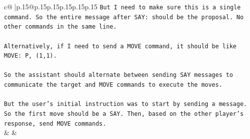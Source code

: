 \documentclass{article}
\begin{document}
{\begin{supertabular}{c@{$\;$}|p{.15\linewidth}@{}p{.15\linewidth}p{.15\linewidth}p{.15\linewidth}p{.15\linewidth}p{.15\linewidth}}
{{{\texttt{But I need to make sure this is a single command. So the entire message after SAY: should be the proposal. No other commands in the same line.} \\
\\ 
\texttt{Alternatively, if I need to send a MOVE command, it should be like MOVE: P, (1,1).} \\
\\ 
\texttt{So the assistant should alternate between sending SAY messages to communicate the target and MOVE commands to execute the moves.} \\
\\ 
\texttt{But the user's initial instruction was to start by sending a message. So the first move should be a SAY. Then, based on the other player's response, send MOVE commands.} \\
            }
        }
    }
    & & \\ \\


\end{supertabular}}
\end{document}
